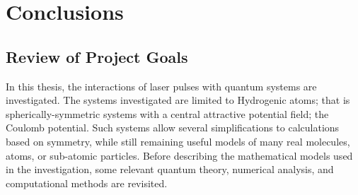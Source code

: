 
\chapter{Conclusions} %

\label{Conc} %


\newcommand{\keyword}[1]{\textbf{#1}}
\newcommand{\tabhead}[1]{\textbf{#1}}
\newcommand{\code}[1]{\texttt{#1}}
\newcommand{\file}[1]{\texttt{\bfseries#1}}
\newcommand{\option}[1]{\texttt{\itshape#1}}


\section{Review of Project Goals}


In this thesis, the interactions of laser pulses with quantum systems are investigated. The systems investigated are limited to Hydrogenic atoms; that is spherically-symmetric systems with a central attractive potential field; the Coulomb potential. Such systems allow several simplifications to calculations based on symmetry, while still remaining useful models of many real molecules, atoms, or sub-atomic particles. Before describing the mathematical models used in the investigation, some relevant quantum theory, numerical analysis, and computational methods are revisited.

